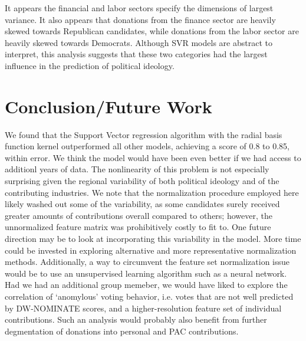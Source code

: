 \documentclass[12]{article}
\begin{document}
\noindent It appears the financial and labor sectors specify the dimensions of largest
variance. It also appears that donations from the finance sector are heavily skewed 
towards Republican candidates, while donations from the labor sector are heavily skewed towards
Democrats. Although SVR models are abstract to interpret, this analysis suggests
that these two categories had the largest influence in the prediction of political 
ideology.

\section*{Conclusion/Future Work}

We found that the Support Vector regression algorithm with the radial basis function kernel outperformed all other models, achieving a score of 0.8 to 0.85, within error. We think the model would have been even better if we had access to additionl years of data. The nonlinearity of this problem is not especially surprising given the regional variability of both political ideology and of the contributing industries. We note that the normalization procedure employed here likely washed out some of the variability, as some candidates surely received greater amounts of contributions overall compared to others; however, the unnormalized feature matrix was prohibitively costly to fit to. One future direction may be to look at incorporating this variability in the model. More time could be invested in exploring alternative and more representative normalization methods. Additionally, a way to circumvent the feature set normalization issue would be to use an unsupervised learning algorithm such as a neural network.\\

\noindent Had we had an additional group memeber, we would have liked to explore the correlation of `anomylous' voting behavior, i.e. votes that are not well predicted by DW-NOMINATE scores, and a higher-resolution feature set of individual contributions. Such an analysis would probably also benefit from further degmentation of donations into personal and PAC contributions.\\

\printbibliography
\end{document}
